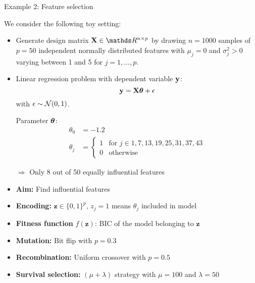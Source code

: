 \documentclass[11pt,compress,t,notes=noshow, xcolor=table]{beamer}
\begin{document}
\begin{vbframe}{Example 2: Feature selection}

We consider the following toy setting:

\begin{itemize}
\item Generate design matrix $\Xmat \in \R^{n \times p}$ by drawing $n = 1000$ samples of $p = 50$ independent normally distributed features with $\mu_j = 0$ and $\sigma_j^2 > 0$ varying between 1 and 5 for $j = 1, \dots, p$.
\item Linear regression problem with dependent variable $\mathbf{y}$:
$$
    \mathbf{y} = \mathbf{X} \bm{\theta} + \epsilon
$$
with $\epsilon \sim \mathcal N(0, 1)$.

\medskip

Parameter $\bm{\theta}$:
\begin{align*}
    \theta_0 &= - 1.2 \\
    \theta_j &= \begin{cases}
        1 & \text{for $j \in {1, 7, 13, 19, 25, 31, 37, 43}$} \\
        0 & \text{otherwise}
    \end{cases}
\end{align*}

$\Rightarrow$ Only 8 out of 50 equally influential features
 

\end{itemize}

\framebreak

\begin{itemize}
    \item \textbf{Aim:} Find influential features
    \item \textbf{Encoding:} $\textbf{z} \in \{0, 1\}^p$, $z_j = 1$ means $\theta_j$ included in model
    \item \textbf{Fitness function} $f(\mathbf{z})$: BIC of the model belonging to $\mathbf{z}$
    \item \textbf{Mutation:} Bit flip with $p = 0.3$
    \item \textbf{Recombination:} Uniform crossover with $p=0.5$
    \item \textbf{Survival selection:} $(\mu + \lambda)$ strategy with $\mu = 100$ and $\lambda =50$
\end{itemize}


\end{vbframe}
\end{document}
